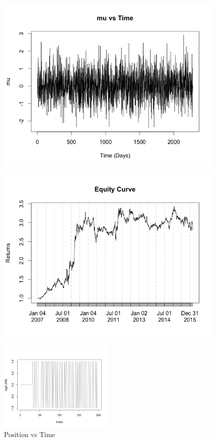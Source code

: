 \documentclass[12pt]{article}
\theoremstyle{definition}
\begin{document}
\begin{figure}
\centering
\begin{minipage}{0.5\textwidth}
  \centering
  \includegraphics[width=1\textwidth]{ts1}
  \label{fig:test1}
\end{minipage}%
\begin{minipage}{0.5\textwidth}
  \centering
  \includegraphics[width=1\textwidth]{ts2}
  \label{fig:test2}
\end{minipage}
\end{figure}

\begin{figure}
\centering
\includegraphics[width=0.5\textwidth]{ts3}
\caption{Position vs Time}
\end{figure}
\end{document}
